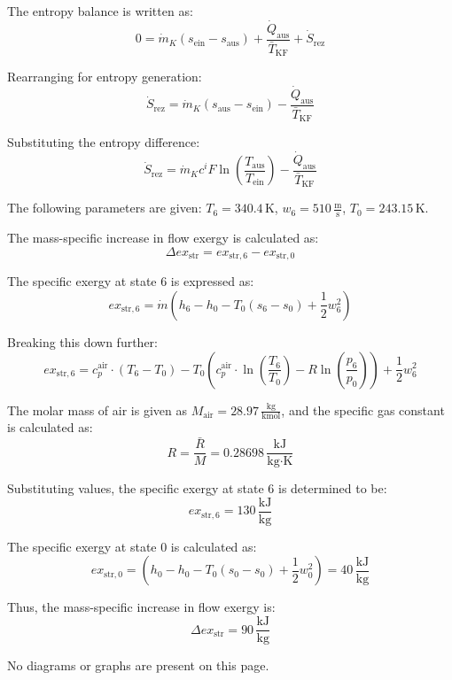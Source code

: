 The entropy balance is written as:  
\[
0 = \dot{m}_K (s_{\text{ein}} - s_{\text{aus}}) + \frac{\dot{Q}_{\text{aus}}}{\bar{T}_{\text{KF}}} + \dot{S}_{\text{rez}}
\]

Rearranging for entropy generation:  
\[
\dot{S}_{\text{rez}} = \dot{m}_K (s_{\text{aus}} - s_{\text{ein}}) - \frac{\dot{Q}_{\text{aus}}}{\bar{T}_{\text{KF}}}
\]

Substituting the entropy difference:  
\[
\dot{S}_{\text{rez}} = \dot{m}_K c^i F \ln \left( \frac{T_{\text{aus}}}{T_{\text{ein}}} \right) - \frac{\dot{Q}_{\text{aus}}}{\bar{T}_{\text{KF}}}
\]

The following parameters are given:  
\( T_6 = 340.4 \, \text{K} \), \( w_6 = 510 \, \frac{\text{m}}{\text{s}} \), \( T_0 = 243.15 \, \text{K} \).  

The mass-specific increase in flow exergy is calculated as:  
\[
\Delta ex_{\text{str}} = ex_{\text{str},6} - ex_{\text{str},0}
\]  

The specific exergy at state 6 is expressed as:  
\[
ex_{\text{str},6} = \dot{m} \left( h_6 - h_0 - T_0 (s_6 - s_0) + \frac{1}{2} w_6^2 \right)
\]  

Breaking this down further:  
\[
ex_{\text{str},6} = c_p^{\text{air}} \cdot (T_6 - T_0) - T_0 \left( c_p^{\text{air}} \cdot \ln \left( \frac{T_6}{T_0} \right) - R \ln \left( \frac{p_6}{p_0} \right) \right) + \frac{1}{2} w_6^2
\]  

The molar mass of air is given as \( M_{\text{air}} = 28.97 \, \frac{\text{kg}}{\text{kmol}} \), and the specific gas constant is calculated as:  
\[
R = \frac{\bar{R}}{M} = 0.28698 \, \frac{\text{kJ}}{\text{kg·K}}
\]  

Substituting values, the specific exergy at state 6 is determined to be:  
\[
ex_{\text{str},6} = 130 \, \frac{\text{kJ}}{\text{kg}}
\]  

The specific exergy at state 0 is calculated as:  
\[
ex_{\text{str},0} = \left( h_0 - h_0 - T_0 (s_0 - s_0) + \frac{1}{2} w_0^2 \right) = 40 \, \frac{\text{kJ}}{\text{kg}}
\]  

Thus, the mass-specific increase in flow exergy is:  
\[
\Delta ex_{\text{str}} = 90 \, \frac{\text{kJ}}{\text{kg}}
\]  

No diagrams or graphs are present on this page.